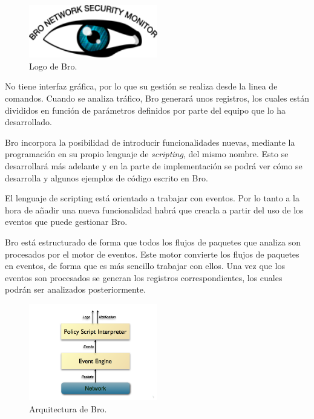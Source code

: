 \begin{figure}[H]
  \includegraphics[width=0.5\textwidth]{imagenes/logo-bro.png}
  \centering
  \caption{Logo de Bro.}
\end{figure}

\intro No tiene interfaz gráfica, por lo que su gestión se realiza desde la linea de comandos. Cuando se analiza 
tráfico, Bro generará unos registros, los cuales están divididos en función de parámetros definidos por parte del 
equipo que lo ha desarrollado.

\intro Bro incorpora la posibilidad de introducir funcionalidades nuevas, mediante la programación en su 
propio lenguaje de \textit{scripting}, del mismo nombre. Esto se desarrollará más adelante y en la 
parte de implementación se podrá ver cómo se desarrolla y algunos ejemplos de código escrito en Bro.

\intro El lenguaje de scripting está orientado a trabajar con eventos. Por lo tanto a la hora de añadir una nueva funcionalidad habrá que crearla a partir del uso de los eventos que puede gestionar Bro.

\intro \noindent Bro está estructurado de forma que todos los flujos de paquetes que analiza son procesados por el motor de eventos. Este motor convierte los flujos de paquetes en eventos, de forma que es más sencillo trabajar con ellos. 
Una vez que los eventos son procesados se generan los registros correspondientes, los cuales podrán ser analizados posteriormente. \cite{broarquitectura}

\begin{figure}[H]
  \includegraphics[width=0.5\textwidth]{imagenes/arquitectura-bro.png}
  \centering
  \caption{Arquitectura de Bro.}
\end{figure}


